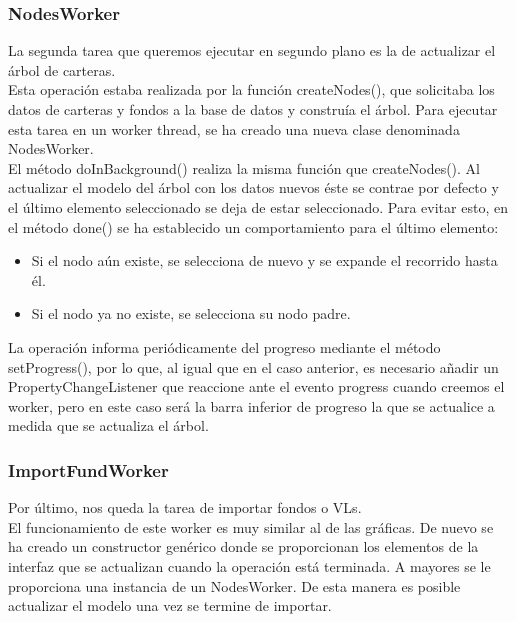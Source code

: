 \documentclass[12pt, a4paper]{book}
\begin{document}
\subsubsection{NodesWorker}

La segunda tarea que queremos ejecutar en segundo plano es la de actualizar el árbol de carteras.\\

Esta operación estaba realizada por la función createNodes(), que solicitaba los datos de carteras y fondos a la base de datos y construía el árbol. Para ejecutar esta tarea en un worker thread, se ha creado una nueva clase denominada NodesWorker.\\

El método doInBackground() realiza la misma función que createNodes(). Al actualizar el modelo del árbol con los datos nuevos éste se contrae por defecto y el último elemento seleccionado se deja de estar seleccionado. Para evitar esto, en el método done() se ha establecido un comportamiento para el último elemento:

\begin{itemize}
	\item Si el nodo aún existe, se selecciona de nuevo y se expande el recorrido hasta él.
	\item Si el nodo ya no existe, se selecciona su nodo padre.
\end{itemize} 

La operación informa periódicamente del progreso mediante el método setProgress(), por lo que, al igual que en el caso anterior, es necesario añadir un PropertyChangeListener que reaccione ante el evento progress cuando creemos el worker, pero en este caso será la barra inferior de progreso la que se actualice a medida que se actualiza el árbol.

\subsubsection{ImportFundWorker}

Por último, nos queda la tarea de importar fondos o \gls{VL}s.\\

El funcionamiento de este worker es muy similar al de las gráficas. De nuevo se ha creado un constructor genérico donde se proporcionan los elementos de la interfaz que se actualizan cuando la operación está terminada. A mayores se le proporciona una instancia de un NodesWorker. De esta manera es posible actualizar el modelo una vez se termine de importar.\\
\end{document}
